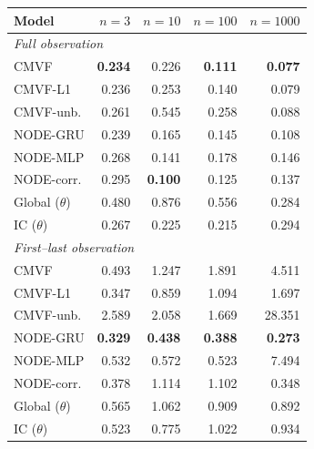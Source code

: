 \begin{tabular}{lrrrr}
\toprule
Model & $n{=}3$ & $n{=}10$ & $n{=}100$ & $n{=}1000$ \\
\midrule
\multicolumn{5}{l}{\emph{Full observation}} \\
CMVF & \textbf{0.234} & 0.226 & \textbf{0.111} & \textbf{0.077} \\
CMVF-L1 & 0.236 & 0.253 & 0.140 & 0.079 \\
CMVF-unb. & 0.261 & 0.545 & 0.258 & 0.088 \\
NODE-GRU & 0.239 & 0.165 & 0.145 & 0.108 \\
NODE-MLP & 0.268 & 0.141 & 0.178 & 0.146 \\
NODE-corr. & 0.295 & \textbf{0.100} & 0.125 & 0.137 \\
Global ($\theta$) & 0.480 & 0.876 & 0.556 & 0.284 \\
IC ($\theta$) & 0.267 & 0.225 & 0.215 & 0.294 \\
\midrule
\multicolumn{5}{l}{\emph{First--last observation}} \\
CMVF & 0.493 & 1.247 & 1.891 & 4.511 \\
CMVF-L1 & 0.347 & 0.859 & 1.094 & 1.697 \\
CMVF-unb. & 2.589 & 2.058 & 1.669 & 28.351 \\
NODE-GRU & \textbf{0.329} & \textbf{0.438} & \textbf{0.388} & \textbf{0.273} \\
NODE-MLP & 0.532 & 0.572 & 0.523 & 7.494 \\
NODE-corr. & 0.378 & 1.114 & 1.102 & 0.348 \\
Global ($\theta$) & 0.565 & 1.062 & 0.909 & 0.892 \\
IC ($\theta$) & 0.523 & 0.775 & 1.022 & 0.934 \\
\bottomrule
\end{tabular}
